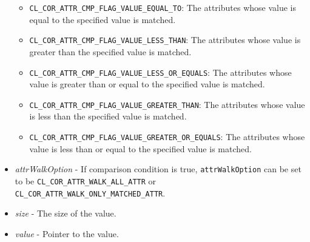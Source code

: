 \begin{flushleft}
\begin{itemize}
 	\begin{itemize}
 	\item
       {\tt{CL\_\-COR\_\-ATTR\_\-CMP\_\-FLAG\_\-VALUE\_\-EQUAL\_\-TO}}: The attributes whose value is equal to the specified value is matched.
 	\item
       {\tt{CL\_\-COR\_\-ATTR\_\-CMP\_\-FLAG\_\-VALUE\_\-LESS\_\-THAN}}: The attributes whose value is greater than the specified value is matched.
        	\item
       {\tt{CL\_\-COR\_\-ATTR\_\-CMP\_\-FLAG\_\-VALUE\_\-LESS\_\-OR\_\-EQUALS}}: The attributes whose value is greater than or equal to the specified 
       value is matched.
        	\item
       {\tt{CL\_\-COR\_\-ATTR\_\-CMP\_\-FLAG\_\-VALUE\_\-GREATER\_\-THAN}}: The attributes whose value is less than the specified value is matched.
        	\item
       {\tt{CL\_\-COR\_\-ATTR\_\-CMP\_\-FLAG\_\-VALUE\_\-GREATER\_\-OR\_\-EQUALS}}: The attributes whose value is less than or equal to the specified 
       value is matched.
	 	\end{itemize}
\item
\textit{attrWalkOption} - If comparison condition is true, {\tt{attrWalkOption}} can be set to
 be {\tt{CL\_\-COR\_\-ATTR\_\-WALK\_\-ALL\_\-ATTR}} or {\tt{CL\_\-COR\_\-ATTR\_\-WALK\_\-ONLY\_\-MATCHED\_\-ATTR}}.
\item
\textit{size} - The size of the value.
\item
\textit{value} - Pointer to the value.
\end{itemize}




\end{flushleft}

